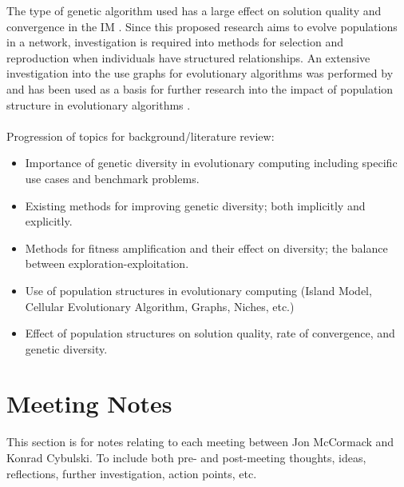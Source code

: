 \documentclass[10pt,a4paper]{article}
\begin{document}
	The type of genetic algorithm used has a large effect on solution quality and convergence in the IM \citep{rucinski2010impact}.
	Since this proposed research aims to evolve populations in a network, investigation is required into methods for selection and reproduction when individuals have structured relationships.
	An extensive investigation into the use graphs for evolutionary algorithms was performed by \citet{bryden2006graph} and has been used as a basis for further research into the impact of population structure in evolutionary algorithms \citep{spector2006trivial, payne2009evolutionary}.
	\\\\
	Progression of topics for background/literature review:
	\begin{itemize}
		\item Importance of genetic diversity in evolutionary computing including specific use cases and benchmark problems.
		\item Existing methods for improving genetic diversity; both implicitly and explicitly.
		\item Methods for fitness amplification and their effect on diversity; the balance between exploration-exploitation.
		\item Use of population structures in evolutionary computing (Island Model, Cellular Evolutionary Algorithm, Graphs, Niches, etc.)
		\item Effect of population structures on solution quality, rate of convergence, and genetic diversity.
	\end{itemize}
	
	
	\pagebreak
	
	\section{Meeting Notes}
	
	This section is for notes relating to each meeting between Jon McCormack and Konrad Cybulski. To include both pre- and post-meeting thoughts, ideas, reflections, further investigation, action points, etc.
	
\end{document}
